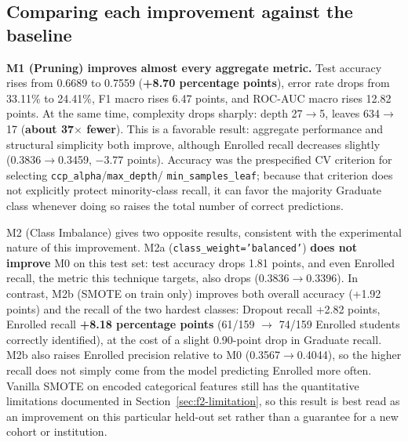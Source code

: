 \subsection{Comparing each improvement against the baseline}

\textbf{M1 (Pruning) improves almost every aggregate metric.} Test
accuracy rises from 0.6689 to 0.7559 (\textbf{+8.70 percentage points}),
error rate drops from 33.11\% to 24.41\%, F1 macro rises 6.47 points, and
ROC-AUC macro rises 12.82 points. At the same time, complexity drops
sharply: depth 27$\to$5, leaves 634$\to$17 (\textbf{about 37$\times$
fewer}). This is a favorable result: aggregate performance and structural
simplicity both improve, although Enrolled recall decreases slightly
(0.3836$\to$0.3459, $-3.77$ points). Accuracy was the prespecified CV
criterion for selecting \texttt{ccp\_alpha}/\texttt{max\_depth}/
\texttt{min\_samples\_leaf}; because that criterion does not explicitly
protect minority-class recall, it can favor the majority Graduate class
whenever doing so raises the total number of correct predictions.

M2 (Class Imbalance) gives two opposite results, consistent with the
experimental nature of this improvement. M2a
(\texttt{class\_weight='balanced'}) \textbf{does not improve} M0 on this
test set: test accuracy drops 1.81 points, and even Enrolled recall, the
metric this technique targets, also drops (0.3836$\to$0.3396). In
contrast, M2b (SMOTE on train only) improves both overall accuracy
(+1.92 points) and the recall of the two hardest classes: Dropout recall
+2.82 points, Enrolled recall \textbf{+8.18 percentage points} (61/159
$\to$ 74/159 Enrolled students correctly identified), at the cost of a
slight 0.90-point drop in Graduate recall. M2b also raises Enrolled
precision relative to M0 (0.3567$\to$0.4044), so the higher recall does
not simply come from the model predicting Enrolled more often. Vanilla
SMOTE on encoded categorical features still has the quantitative limitations
documented in Section~\ref{sec:f2-limitation}, so this result is best read as
an improvement on this particular held-out set rather than a guarantee for a
new cohort or institution.

